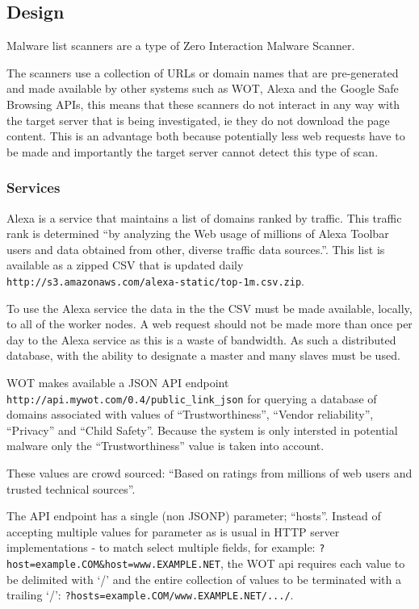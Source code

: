 \subsection{Design}
Malware list scanners are a type of Zero Interaction Malware Scanner.

The scanners use a collection of URLs or domain names that are pre-generated and made available by other systems such as WOT, Alexa and the Google Safe Browsing APIs, this means that these scanners do not interact in any way with the target server that is being investigated, ie they do not download the page content. This is an advantage both because potentially less web requests have to be made and importantly the target server cannot detect this type of scan.

\subsubsection{Services}
Alexa is a service that maintains a list of domains ranked by traffic. This traffic rank is determined ``by analyzing the Web usage of millions of Alexa Toolbar users and data obtained from other, diverse traffic data sources.''\cite{alexa-about}. This list is available as a zipped CSV that is updated daily \verb`http://s3.amazonaws.com/alexa-static/top-1m.csv.zip`.

To use the Alexa service the data in the the CSV must be made available, locally, to all of the worker nodes. A web request should not be made more than once per day to the Alexa service as this is a waste of bandwidth. As such a distributed database, with the ability to designate a master and many slaves must be used.

WOT makes available a JSON API endpoint \verb`http://api.mywot.com/0.4/public_link_json` for querying a database of domains associated with values of ``Trustworthiness'', ``Vendor reliability'', ``Privacy'' and ``Child Safety''. Because the system is only intersted in potential malware only the ``Trustworthiness'' value is taken into account.

These values are crowd sourced: ``Based on ratings from millions of web users and trusted technical sources''\cite{wot-about}.

The API endpoint has a single (non JSONP) parameter; ``hosts''. Instead of accepting multiple values for parameter as is usual in HTTP server implementations - to match select multiple fields, for example: \verb`?host=example.COM&host=www.EXAMPLE.NET`, the WOT api requires each value to be delimited with `/' and the entire collection of values to be terminated with a trailing `/': \verb`?hosts=example.COM/www.EXAMPLE.NET/.../`.

